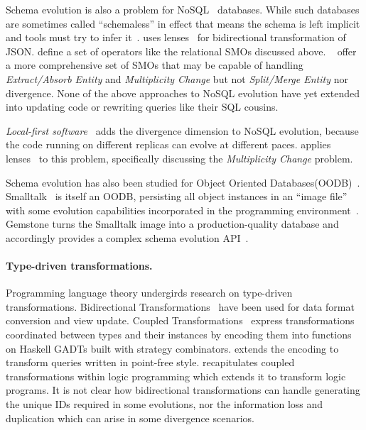 \documentclass[english,submission]{programming}
\begin{document}
Schema evolution is also a problem for NoSQL~\cite{sadalage12} databases. While such databases are sometimes called ``schemaless'' in effect that means the schema is left implicit and tools must try to infer it~\cite{storl20, storl22}. \citet{Cambria} uses lenses~\cite{Foster2007} for bidirectional transformation of JSON. \citet{scherzinger13} define a set of operators like the relational SMOs discussed above. \citeauthor*{chillon21}~\cite{chillon21, chillon22} offer a more comprehensive set of SMOs that may be capable of handling \textit{Extract/Absorb Entity} and \emph{Multiplicity Change} but not \emph{Split/Merge Entity} nor divergence. None of the above approaches to NoSQL evolution have yet extended into updating code or rewriting queries like their SQL cousins.

\emph{Local-first software}~\cite{localfirst} adds the divergence dimension to NoSQL evolution, because the code running on different replicas can evolve at different paces. \citet{Cambria} applies lenses~\cite{Foster2007} to this problem, specifically discussing the \emph{Multiplicity Change} problem.

Schema evolution has also been studied for Object Oriented Databases(OODB)~\cite{li99,banerjee87}. Smalltalk~\cite{Goldberg80} is itself an OODB, persisting all object instances in an ``image file'' with some evolution capabilities incorporated in the programming environment~\cite[pp.252-272]{Goldberg80}. Gemstone turns the Smalltalk image into a production-quality database and accordingly provides a complex schema evolution API~\cite{Gemstone}.

\paragraph{Type-driven transformations.}
Programming language theory undergirds research on type-driven transformations. Bidirectional Transformations~\cite{czarnecki2009bidirectional} have been used for data format conversion and view update.
Coupled Transformations~\cite{Berdaguer07, alcino06, Cleve2006} express transformations coordinated between types and their instances by encoding them into functions on Haskell GADTs built with strategy combinators. \citet{JVisser08} extends the encoding to transform queries written in point-free style. \citet{lammel16} recapitulates coupled transformations within logic programming which extends it to transform logic programs. It is not clear how bidirectional transformations can handle generating the unique IDs required in some evolutions, nor the information loss and duplication which can arise in some divergence scenarios.
\end{document}
